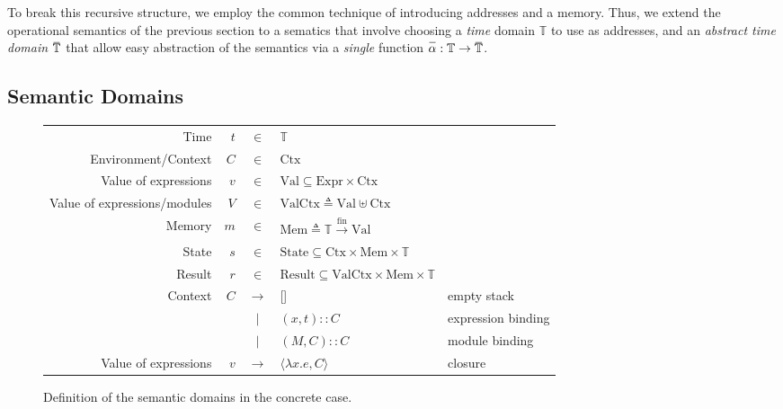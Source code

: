 \documentclass{article}
\theoremstyle{definition}
\newcommand*{\vbar}{|}
\newcommand*{\cons}{::}
\def\ovbarw{1.2mu}
\def\ovbarh{1}
\newcommand*{\ovbar}[1]{\mkern \ovbarw\overline{\mkern-\ovbarw{\smash{#1}\scalebox{1}[\ovbarh]{\vphantom{i}}}\mkern-\ovbarw}\mkern \ovbarw}
\newcommand*{\A}[1]{\ovbar{#1}}
\newcommand*{\Expr}{\text{Expr}}
\newcommand*{\Time}{\mathbb{T}}
\newcommand*{\Ctx}{\text{Ctx}}
\newcommand*{\Value}{\text{Val}}
\newcommand*{\Mem}{\text{Mem}}
\newcommand*{\mem}{m}
\newcommand*{\State}{\text{State}}
\newcommand*{\Result}{\text{Result}}
\newcommand*{\fin}[2]{{#1}\xrightarrow{\text{fin}}{#2}}
\begin{document}
To break this recursive structure, we employ the common technique of introducing addresses and a memory.
Thus, we extend the operational semantics of the previous section to a sematics that involve choosing a \emph{time} domain $\Time$ to use as addresses,
and an \emph{abstract time domain} $\A\Time$ that allow easy abstraction of the semantics via a \emph{single} function $\A\alpha:\Time\rightarrow\A\Time$.

\subsection{Semantic Domains}
\begin{figure}[h!]
  \centering
  \begin{tabular}{rrcll}
    Time                         & $t$    & $\in$         & $\Time$                                                                  \\
    Environment/Context          & $C$    & $\in$         & $\Ctx$                                                                   \\
    Value of expressions         & $v$    & $\in$         & $\Value \subseteq \Expr\times\Ctx$                                       \\
    Value of expressions/modules & $V$    & $\in$         & $\Value\Ctx\triangleq\Value\uplus\Ctx$                                   \\
    Memory                       & $\mem$ & $\in$         & $\Mem \triangleq \fin{\Time}{\Value}$                                    \\
    State                        & $s$    & $\in$         & $\State \subseteq \Ctx\times\Mem\times\Time$                             \\
    Result                       & $r$    & $\in$         & $\Result \subseteq \Value\Ctx\times\Mem\times\Time$                      \\
    Context                      & $C$    & $\rightarrow$ & []                                                  & empty stack        \\
                                 &        & $\vbar$       & $(x,t)\cons C$                                      & expression binding \\
                                 &        & $\vbar$       & $(M,C)\cons C$                                      & module binding     \\
    Value of expressions         & $v$    & $\rightarrow$ & $\langle \lambda x.e, C \rangle$                    & closure
  \end{tabular}
  \caption{Definition of the semantic domains in the concrete case.}
  \label{fig:concdom}
\end{figure}
\end{document}
